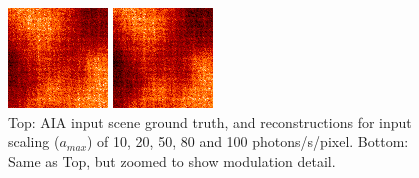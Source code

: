 \documentclass[tocnosub,noragright,centerchapter,12pt]{uiucecethesis09}
\begin{document}
\begin{figure}
{\begin{minipage}{.19\textwidth}
  \end{minipage}%
  \begin{minipage}{.19\textwidth}
    \centering
    \includegraphics[width=.95\textwidth]{figures/aia_recon_zoom80.png}
  \end{minipage}%
  \begin{minipage}{.19\textwidth}
    \centering
    \includegraphics[width=.95\textwidth]{figures/aia_recon_zoom100.png}
  \end{minipage}%
  }
  \caption{Top: AIA input scene ground truth, and reconstructions for input scaling ($a_{max}$) of 10, 20, 50, 80 and 100 photons/s/pixel.  Bottom: Same as Top, but zoomed to show modulation detail.}
  \label{fig:noise_tolerance}
\end{figure}
\end{document}
